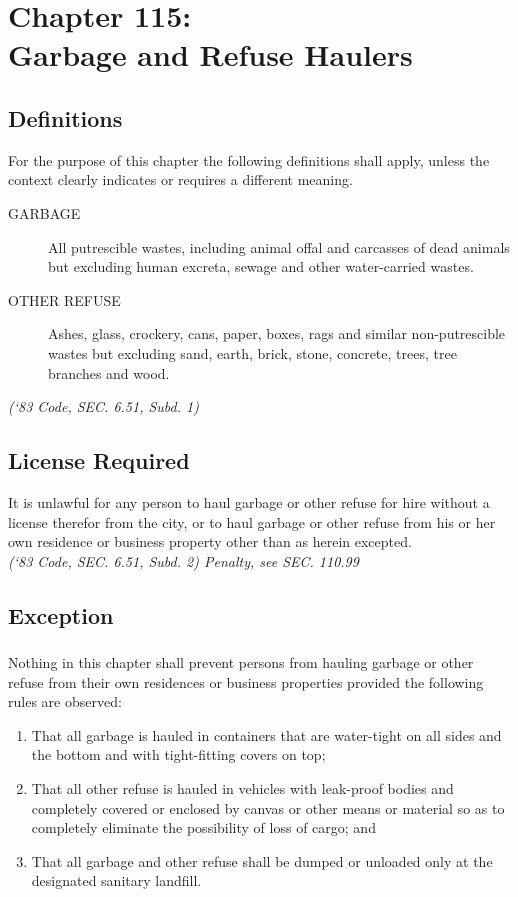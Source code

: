 \chapter*{Chapter 115: \\
	Garbage and Refuse Haulers}
    \minitoc
    \pagebreak

\section{Definitions}
For the purpose of this chapter the following definitions shall apply, unless the context clearly indicates or requires a different meaning.
\begin{description}
    \item[GARBAGE] All putrescible wastes, including animal offal and carcasses of dead animals but excluding human excreta, sewage and other water-carried wastes.
    \item[OTHER REFUSE] Ashes, glass, crockery, cans, paper, boxes, rags and similar non-putrescible wastes but excluding sand, earth, brick, stone, concrete, trees, tree branches and wood.
\end{description}
\emph{(‘83 Code, SEC. 6.51, Subd. 1)}
\section{License Required}
It is unlawful for any person to haul garbage or other refuse for hire without a license therefor from the city, or to haul garbage or other refuse from his or her own residence or business property other than as herein excepted.\\
\emph{(‘83 Code, SEC. 6.51, Subd. 2)  Penalty, see SEC. 110.99}
\section{Exception}
\subsection{}
Nothing in this chapter shall prevent persons from hauling garbage or other refuse from their own residences or business properties provided the following rules are observed:
\begin{enumerate}[{\indent}1)]
    \item That all garbage is hauled in containers that are water-tight on all sides and the bottom and with tight-fitting covers on top;
    \item That all other refuse is hauled in vehicles with leak-proof bodies and completely covered or enclosed by canvas or other means or material so as to completely eliminate the possibility of loss of cargo; and
    \item That all garbage and other refuse shall be dumped or unloaded only at the designated sanitary landfill.
\end{enumerate}
